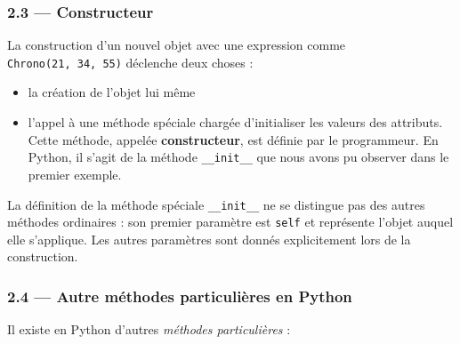 \documentclass[a4paper,17pt]{extarticle}
\providecommand{\tightlist}{%
      \setlength{\itemsep}{0pt}\setlength{\parskip}{0pt}}
\begin{document}
    \hypertarget{constructeur}{%
\subsubsection{2.3 --- Constructeur}\label{constructeur}}
\begin{retenir}
    La construction d'un nouvel objet avec une expression comme
\texttt{Chrono(21,\ 34,\ 55)} déclenche deux choses :

\begin{itemize}
\tightlist
\item
  la création de l'objet lui même
\item
  l'appel à une méthode spéciale chargée d'initialiser les valeurs des
  attributs. Cette méthode, appelée \textbf{constructeur}, est définie
  par le programmeur. En Python, il s'agit de la méthode
  \texttt{\_\_init\_\_} que nous avons pu observer dans le premier
  exemple.
\end{itemize}

La définition de la méthode spéciale \texttt{\_\_init\_\_} ne se
distingue pas des autres méthodes ordinaires : son premier paramètre est
\texttt{self} et représente l'objet auquel elle s'applique. Les autres
paramètres sont donnés explicitement lors de la construction.

        \end{retenir}
    \hypertarget{autre-muxe9thodes-particuliuxe8res-en-python}{%
\subsubsection{2.4 --- Autre méthodes particulières en
Python}\label{autre-muxe9thodes-particuliuxe8res-en-python}}

    Il existe en Python d'autres \emph{méthodes particulières} :
\end{document}
